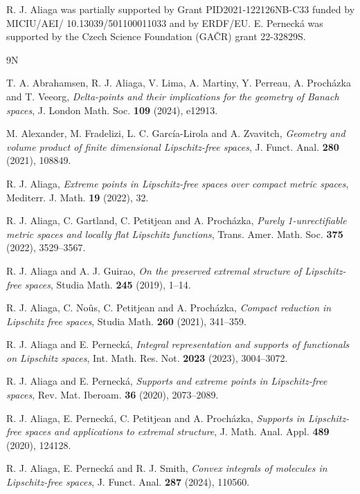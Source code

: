 \documentclass[a4paper,10pt]{amsart}
\theoremstyle{plain}
\theoremstyle{definition}
\theoremstyle{remark}
\begin{document}
R. J. Aliaga was partially supported by Grant PID2021-122126NB-C33 funded by MICIU/AEI/ 10.13039/501100011033 and by ERDF/EU. E. Perneck\'a was supported by the Czech Science Foundation (GA\v CR) grant 22-32829S.


\begin{thebibliography}{9N}

	T. A. Abrahamsen, R. J. Aliaga, V. Lima, A. Martiny, Y. Perreau, A. Proch\'azka and T. Veeorg,
	\emph{Delta-points and their implications for the geometry of Banach spaces},
	J. London Math. Soc. \textbf{109} (2024), e12913.

    M. Alexander, M. Fradelizi, L. C. Garc\'ia-Lirola and A. Zvavitch,
    \emph{Geometry and volume product of finite dimensional Lipschitz-free spaces},
    J. Funct. Anal. \textbf{280} (2021), 108849.

	R. J. Aliaga,
	\emph{Extreme points in Lipschitz-free spaces over compact metric spaces},
	Mediterr. J. Math. \textbf{19} (2022), 32.

	R. J. Aliaga, C. Gartland, C. Petitjean and A. Proch\'azka,
	\emph{Purely 1-unrectifiable metric spaces and locally flat Lipschitz functions},
	Trans. Amer. Math. Soc. \textbf{375} (2022), 3529--3567.

	R. J. Aliaga and A. J. Guirao,
	\emph{On the preserved extremal structure of Lipschitz-free spaces},
	Studia Math. \textbf{245} (2019), 1--14.

	R. J. Aliaga, C. No\^us, C. Petitjean and A. Proch\'azka,
	\emph{Compact reduction in Lipschitz free spaces},
	Studia Math. \textbf{260} (2021), 341--359.

	R. J. Aliaga and E. Perneck\'a,
	\emph{Integral representation and supports of functionals on Lipschitz spaces},
	Int. Math. Res. Not. \textbf{2023} (2023), 3004--3072.
	
	R. J. Aliaga and E. Perneck\'a,
	\emph{Supports and extreme points in Lipschitz-free spaces},
	Rev. Mat. Iberoam. \textbf{36} (2020), 2073--2089.

	R. J. Aliaga, E. Perneck\'a, C. Petitjean and A. Proch\'azka,
	\emph{Supports in Lipschitz-free spaces and applications to extremal structure},
	J. Math. Anal. Appl. \textbf{489} (2020), 124128.
	
	R. J. Aliaga, E. Perneck\'a and R. J. Smith,
	\emph{Convex integrals of molecules in Lipschitz-free spaces},
	J. Funct. Anal. \textbf{287} (2024), 110560.
	

\end{thebibliography}
\end{document}
